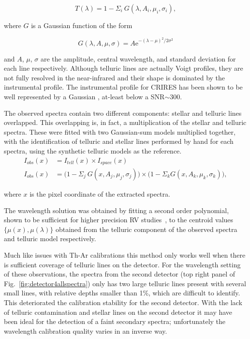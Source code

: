 \documentclass[fleqn,usenatbib]{mnras}
\newcommand*\rd{\color{red}}
\begin{document}
\begin{equation}
T(\lambda) = 1 - {\Sigma}_{i}\ G(\lambda, A_{i}, {\mu}_{i}, {\sigma}_{i}),
\end{equation}

where \(G \) is a Gaussian function of the form

\begin{equation}
G(\lambda, A, \mu, \sigma) = {A \textrm{e}}^{{-(\lambda-\mu)}^{2}/2\sigma^{2}}
\end{equation}

and \(A \), \(\mu \), \(\sigma \) are the amplitude, central wavelength, and standard deviation for each line respectively. {\rd Although telluric lines are actually Voigt profiles, they are not fully resolved in the near-infrared and their shape is dominated by the instrumental profile. The instrumental profile for CRIRES  has been shown to be well represented by a Gaussian \citep{seifahrt_synthesising_2010a}, at-least below a SNR\(\sim300\).}

The observed spectra contain two different components: stellar and telluric lines overlapped. This overlapping is, in fact, a multiplication of the stellar and telluric spectra. These were fitted with two Gaussian-sum models multiplied together, with the identification of telluric and stellar lines performed {\rd by hand} for each spectra, using the synthetic telluric models as the reference.
\begin{align}
I_{obs}(x) &= I_{tell}(x) \times I_{space}(x) \nonumber \\
I_{obs}(x) &= \Big(1 - {\Sigma}_{j}\ G(x, A_{j}, {\mu}_{j}, {\sigma}_{j})\Big) \times \Big(1 - {\Sigma}_{k} G(x, A_{k}, {\mu}_{k}, {\sigma}_{k})\Big), \label{eqn:obs}
\end{align}

where \(x \) is the pixel coordinate of the extracted spectra.

The wavelength solution was obtained by fitting a second order polynomial, shown to be sufficient for higher precision RV studies~\citep[e.g.][]{bean_groundbased_2010, figueira_radial_2010, seifahrt_synthesising_2010a}, to the centroid values \(\{\mu(x), \mu(\lambda)\} \) obtained from the telluric component of the observed spectra and telluric model respectively. 

Much like issues with Th-Ar calibrations this method only works well when there is sufficient coverage of telluric lines on the detector. For the wavelength setting of these observations, the spectra from the second detector (top right panel of Fig.~\ref{fig:detector4allspectra}) only has two large telluric lines present with several small lines, with relative depths smaller than 1\%, which are difficult to identify. This deteriorated the calibration stability for the second detector. With the lack of telluric contamination and stellar lines on the second detector it may have been ideal for the detection of a faint secondary spectra; unfortunately the wavelength calibration quality varies in an inverse way.
\end{document}

